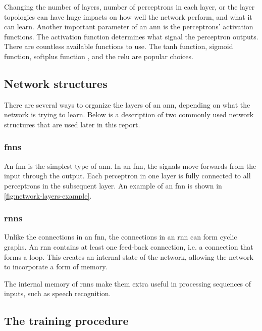 Changing the number of layers, number of perceptrons in each layer, or the layer topologies can have huge impacts on how well the network perform, and what it can learn. Another important parameter of an \gls{ann} is the perceptrons' activation functions. The activation function determines what signal the perceptron outputs. There are countless available functions to use. The \gls{tanh} function, sigmoid function, softplus function \citep{bib:glorot2011deep}, and the \gls{relu} \citep{bib:nair2010rectified} are popular choices.

\subsection{Network structures}
\label{subsec:network-types}

There are several ways to organize the layers of an \gls{ann}, depending on what the network is trying to learn. Below is a description of two commonly used network structures that are used later in this report.

\subsubsection{\glspl{fnn}}

An \gls{fnn} is the simplest type of \gls{ann}. In an \gls{fnn}, the signals move forwards from the input through the output. Each perceptron in one layer is fully connected to all perceptrons in the subsequent layer. An example of an \gls{fnn} is shown in \cref{fig:network-layers-example}.

\subsubsection{\glspl{rnn}}

Unlike the connections in an \gls{fnn}, the connections in an \gls{rnn} can form cyclic graphs. An \gls{rnn} contains at least one feed-back connection, i.e. a connection that forms a loop. This creates an internal state of the network, allowing the network to incorporate a form of memory.

The internal memory of \glspl{rnn} make them extra useful in processing sequences of inputs, such as speech recognition.


\subsection{The training procedure}

